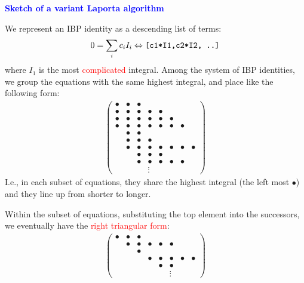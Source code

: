 \documentclass[10pt]{article}
\begin{document}
\textbf{\textcolor{blue}{Sketch of a variant Laporta algorithm}}

We represent an IBP identity as a descending list of terms:
\begin{eqnarray}
\nonumber
0 = \sum_i c_i I_i \Leftrightarrow \verb|[c1*I1,c2*I2, ..]|
\end{eqnarray}
where $I_1$ is the most \textcolor{red}{complicated} integral.
Among the system of IBP identities, we group the equations with the same highest integral, and place like the following form:
\begin{eqnarray}
\nonumber
\left(\begin{array}{cccccccc} 
\bullet & \bullet & \bullet \\
\bullet & \bullet & \bullet & \bullet &\bullet \\
\bullet & \bullet & \bullet & \bullet &\bullet & \bullet\\
\bullet & \bullet & \bullet & \bullet &\bullet & \bullet & \bullet\\
&\bullet & \bullet & \\
&\bullet & \bullet & \bullet & \\
&\bullet & \bullet & \bullet &\bullet &\bullet &\bullet & \bullet\\
&&\bullet & \bullet & \bullet \\
&&\bullet & \bullet &\bullet & \bullet &\bullet \\
&&&\vdots
\end{array}\right)
\end{eqnarray}
I.e., in each subset of equations, they share the highest integral (the left most $\bullet$) and they line up from shorter to longer.

Within the subset of equations, substituting the top element into the successors, we eventually have the \textcolor{red}{right triangular form}:
\begin{eqnarray}
\nonumber
\left(\begin{array}{cccccccc} 
\bullet & \bullet & \bullet \\
&\bullet & \bullet & \bullet & \bullet &\bullet \\
&&\bullet \\
&&& \bullet & \bullet & \bullet &\bullet & \bullet\\
&&&&\bullet & \bullet & \\
&&&&&\vdots
\end{array}\right)
\end{eqnarray}
\end{document}
